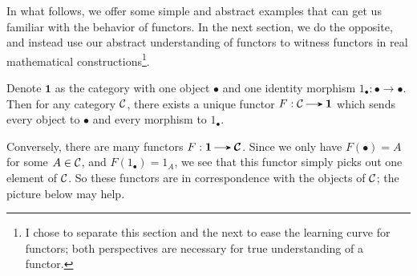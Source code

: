     In what follows, we offer some simple and abstract examples that 
    can get us familiar with the behavior of functors. In the next section, 
    we do the opposite, and instead use our abstract understanding of functors to 
    witness functors in real mathematical constructions\footnote{I chose to separate this section and the 
    next to ease the learning curve for functors; both perspectives are necessary for true understanding 
    of a functor.}.  

    \begin{example}
        Denote $\bm{1}$ as the category with one 
        object $\bullet$ and one identity morphism $1_\bullet: \bullet \to \bullet$. 
        Then for any category $\mathcal{C}$, there exists 
        a unique functor $F: \cc \to \bm{1}$ which sends every object to $\bullet$ 
        and every morphism to $1_\bullet$. 

        Conversely, there are many functors $F: \bm{1} \to \bm{\cc}$. Since we only have 
        $F(\bullet) = A$ for some $A \in \mathcal{C}$, and $F(1_\bullet) = 1_A$, we see that this functor 
        simply picks out one element of $\mathcal{C}$. So these functors are in correspondence 
        with the objects of $\mathcal{C}$; the picture below may help.

        \begin{center}
        \end{center}
    \end{example}

